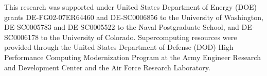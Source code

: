 \documentclass[draft,linenumbers]{agujournal}
\begin{document}
%
%
%
%
%
%
%

\acknowledgments
This research was supported under United States Department of Energy (DOE) grants DE-FG02-07ER64460 and DE-SC0006856 to the University of Washington, DE-SC0005783 and DE-SC0005522 to the Naval Postgraduate School, and DE-SC0006178 to the University of Colorado.
Supercomputing resources were provided through the United States Department of Defense (DOD) High Performance Computing Modernization Program at the Army Engineer Research and Development Center and the Air Force Research Laboratory.










%
%
%
%
%
%
%
%
%
%
\end{document}
